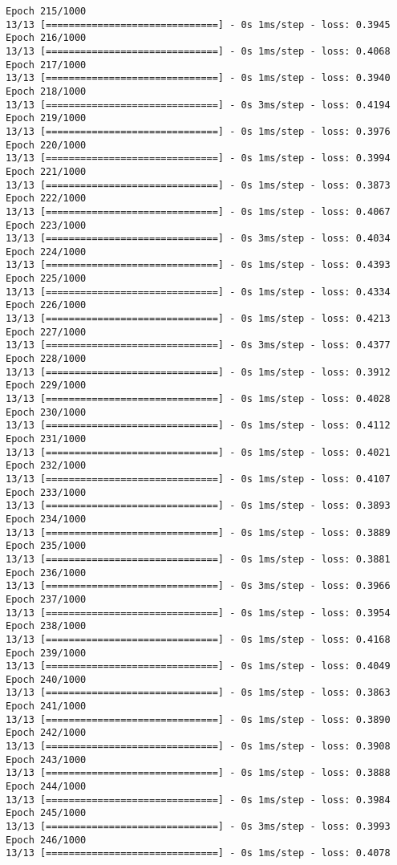 \documentclass[11pt]{article}
\begin{document}
\begin{Verbatim}[commandchars=\\\{\}]
Epoch 215/1000
13/13 [==============================] - 0s 1ms/step - loss: 0.3945
Epoch 216/1000
13/13 [==============================] - 0s 1ms/step - loss: 0.4068
Epoch 217/1000
13/13 [==============================] - 0s 1ms/step - loss: 0.3940
Epoch 218/1000
13/13 [==============================] - 0s 3ms/step - loss: 0.4194
Epoch 219/1000
13/13 [==============================] - 0s 1ms/step - loss: 0.3976
Epoch 220/1000
13/13 [==============================] - 0s 1ms/step - loss: 0.3994
Epoch 221/1000
13/13 [==============================] - 0s 1ms/step - loss: 0.3873
Epoch 222/1000
13/13 [==============================] - 0s 1ms/step - loss: 0.4067
Epoch 223/1000
13/13 [==============================] - 0s 3ms/step - loss: 0.4034
Epoch 224/1000
13/13 [==============================] - 0s 1ms/step - loss: 0.4393
Epoch 225/1000
13/13 [==============================] - 0s 1ms/step - loss: 0.4334
Epoch 226/1000
13/13 [==============================] - 0s 1ms/step - loss: 0.4213
Epoch 227/1000
13/13 [==============================] - 0s 3ms/step - loss: 0.4377
Epoch 228/1000
13/13 [==============================] - 0s 1ms/step - loss: 0.3912
Epoch 229/1000
13/13 [==============================] - 0s 1ms/step - loss: 0.4028
Epoch 230/1000
13/13 [==============================] - 0s 1ms/step - loss: 0.4112
Epoch 231/1000
13/13 [==============================] - 0s 1ms/step - loss: 0.4021
Epoch 232/1000
13/13 [==============================] - 0s 1ms/step - loss: 0.4107
Epoch 233/1000
13/13 [==============================] - 0s 1ms/step - loss: 0.3893
Epoch 234/1000
13/13 [==============================] - 0s 1ms/step - loss: 0.3889
Epoch 235/1000
13/13 [==============================] - 0s 1ms/step - loss: 0.3881
Epoch 236/1000
13/13 [==============================] - 0s 3ms/step - loss: 0.3966
Epoch 237/1000
13/13 [==============================] - 0s 1ms/step - loss: 0.3954
Epoch 238/1000
13/13 [==============================] - 0s 1ms/step - loss: 0.4168
Epoch 239/1000
13/13 [==============================] - 0s 1ms/step - loss: 0.4049
Epoch 240/1000
13/13 [==============================] - 0s 1ms/step - loss: 0.3863
Epoch 241/1000
13/13 [==============================] - 0s 1ms/step - loss: 0.3890
Epoch 242/1000
13/13 [==============================] - 0s 1ms/step - loss: 0.3908
Epoch 243/1000
13/13 [==============================] - 0s 1ms/step - loss: 0.3888
Epoch 244/1000
13/13 [==============================] - 0s 1ms/step - loss: 0.3984
Epoch 245/1000
13/13 [==============================] - 0s 3ms/step - loss: 0.3993
Epoch 246/1000
13/13 [==============================] - 0s 1ms/step - loss: 0.4078

\end{Verbatim}
\end{document}
